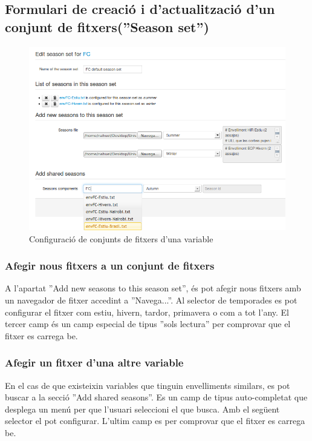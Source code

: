 \subsection{Formulari de creació i d'actualització d'un conjunt de fitxers(''Season set'')}
\label{season_set:variable}
\begin{figure}[h!]
  \centering
  \includegraphics[scale=0.5]{img/userguide/season_set_edition.png}
  \caption{Configuraci\'{o} de conjunts de fitxers d'una variable}
  \label{fig:seasonSetEdition}
\end{figure}

\subsubsection{Afegir nous fitxers a un conjunt de fitxers}
A l'apartat ''Add new seasons to this season set'', \'{e}s pot afegir nous fitxers amb un navegador de fitxer accedint a ''Navega...''. Al selector de temporades es pot configurar el fitxer com estiu, hivern, tardor, primavera o com a tot l'any. El tercer camp \'{e}s un camp especial de tipus ''sols lectura'' per comprovar que el fitxer es carrega be.

\subsubsection{Afegir un fitxer d'una altre variable}
En el cas de que existeixin variables que tinguin envelliments similars, es pot buscar a la secció ''Add shared seasons''. Es un camp de tipus auto-completat que desplega un menú per que l'usuari seleccioni el que busca. Amb el següent selector el pot configurar. L'ultim camp es per comprovar que el fitxer es carrega be.

